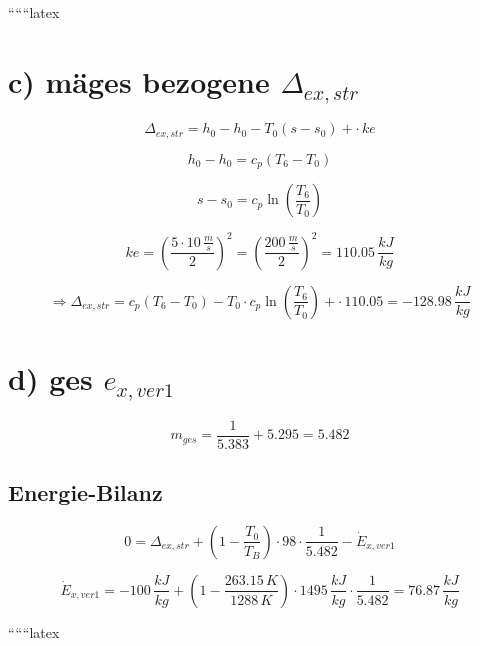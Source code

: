 ``````latex


\section*{c) mäges bezogene $\Delta_{ex,str}$}

\[
\Delta_{ex,str} = h_0 - h_0 - T_0 (s - s_0) + \cdot \, ke
\]

\[
h_0 - h_0 = c_p (T_6 - T_0)
\]

\[
s - s_0 = c_p \ln \left( \frac{T_6}{T_0} \right)
\]

\[
ke = \left( \frac{5 \cdot 10 \, \frac{m}{s}}{2} \right)^2 = \left( \frac{200 \, \frac{m}{s}}{2} \right)^2 = 110.05 \, \frac{kJ}{kg}
\]

\[
\Rightarrow \Delta_{ex,str} = c_p (T_6 - T_0) - T_0 \cdot c_p \ln \left( \frac{T_6}{T_0} \right) + \cdot \, 110.05 = -128.98 \, \frac{kJ}{kg}
\]

\section*{d) ges $e_{x,ver1}$}

\[
m_{ges} = \frac{1}{5.383} + 5.295 = 5.482
\]

\subsection*{Energie-Bilanz}

\[
0 = \Delta_{ex,str} + \left( 1 - \frac{T_0}{T_B} \right) \cdot 98 \cdot \frac{1}{5.482} - \dot{E}_{x,ver1}
\]

\[
\dot{E}_{x,ver1} = -100 \, \frac{kJ}{kg} + \left( 1 - \frac{263.15 \, K}{1288 \, K} \right) \cdot 1495 \, \frac{kJ}{kg} \cdot \frac{1}{5.482} = 76.87 \, \frac{kJ}{kg}
\]

``````latex



